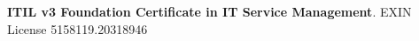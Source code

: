 %
%
%



\begin{scholarship}
									{\textbf{ITIL v3 Foundation Certificate in IT Service Management}. EXIN License 5158119.20318946}
\end{scholarship}
